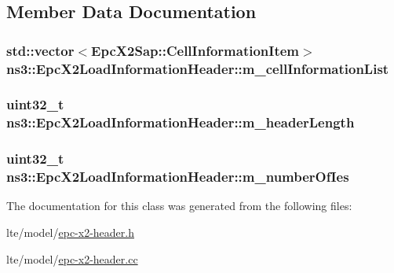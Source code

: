 \subsection{Member Data Documentation}
\subsubsection[{\texorpdfstring{m\+\_\+cell\+Information\+List}{m_cellInformationList}}]{\setlength{\rightskip}{0pt plus 5cm}std\+::vector$<${\bf Epc\+X2\+Sap\+::\+Cell\+Information\+Item}$>$ ns3\+::\+Epc\+X2\+Load\+Information\+Header\+::m\+\_\+cell\+Information\+List\hspace{0.3cm}{\ttfamily [private]}}\hypertarget{classns3_1_1EpcX2LoadInformationHeader_aa998b331b688518c15219cb752eefb16}{}\label{classns3_1_1EpcX2LoadInformationHeader_aa998b331b688518c15219cb752eefb16}
\subsubsection[{\texorpdfstring{m\+\_\+header\+Length}{m_headerLength}}]{\setlength{\rightskip}{0pt plus 5cm}uint32\+\_\+t ns3\+::\+Epc\+X2\+Load\+Information\+Header\+::m\+\_\+header\+Length\hspace{0.3cm}{\ttfamily [private]}}\hypertarget{classns3_1_1EpcX2LoadInformationHeader_a030cb883d52be9e5113a205d4376354c}{}\label{classns3_1_1EpcX2LoadInformationHeader_a030cb883d52be9e5113a205d4376354c}
\subsubsection[{\texorpdfstring{m\+\_\+number\+Of\+Ies}{m_numberOfIes}}]{\setlength{\rightskip}{0pt plus 5cm}uint32\+\_\+t ns3\+::\+Epc\+X2\+Load\+Information\+Header\+::m\+\_\+number\+Of\+Ies\hspace{0.3cm}{\ttfamily [private]}}\hypertarget{classns3_1_1EpcX2LoadInformationHeader_ad2d2b6940608e6f5a4a5228ed8cb1d2c}{}\label{classns3_1_1EpcX2LoadInformationHeader_ad2d2b6940608e6f5a4a5228ed8cb1d2c}


The documentation for this class was generated from the following files\+:\begin{DoxyCompactItemize}
\item 
lte/model/\hyperlink{epc-x2-header_8h}{epc-\/x2-\/header.\+h}\item 
lte/model/\hyperlink{epc-x2-header_8cc}{epc-\/x2-\/header.\+cc}\end{DoxyCompactItemize}
